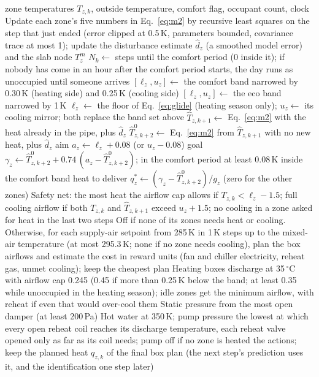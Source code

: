 \documentclass{article}
\begin{document}
\begin{algorithm}[H]
\caption{One five-minute control step of v16, for all zones $z$ at once (Sections~\ref{sec:model}--\ref{sec:schedule}).
Numbers are the settings of Table~\ref{tab:settings}, rounded; airflow caps are fractions of each box's maximum.}\label{alg:step}
\small\raggedright
\begin{algorithmic}[1]
\Require zone temperatures $T_{z,k}$, outside temperature, comfort flag, occupant count, clock
\State Update each zone's five numbers in Eq.~\ref{eq:m2} by recursive least squares on the step that just ended
(error clipped at 0.5\,K, parameters bounded, covariance trace at most 1); update the disturbance estimate $\hat d_z$
(a smoothed model error) and the slab node $T^m_z$
\State $N_k \gets$ steps until the comfort period (0 inside it); if nobody has come in an hour after the comfort
period starts, the day runs as unoccupied until someone arrives
\State $[\ell_z,u_z] \gets$ the comfort band narrowed by 0.30\,K (heating side) and 0.25\,K (cooling side)
\Else
\State $[\ell_z,u_z] \gets$ the eco band narrowed by 1\,K
\EndIf
{}
\State $\ell_z \gets$ the floor of Eq.~\ref{eq:glide} (heating season only); $u_z \gets$ its cooling mirror; both replace the band set above
\EndIf
\State $\hat T_{z,k+1} \gets$ Eq.~\ref{eq:m2} with the heat already in the pipe, plus $\hat d_z$
\State $\hat T^{0}_{z,k+2} \gets$ Eq.~\ref{eq:m2} from $\hat T_{z,k+1}$ with no new heat, plus $\hat d_z$
\State aim $a_z \gets \ell_z+0.08$ (or $u_z-0.08$)
\State goal $\gamma_z \gets \hat T^{0}_{z,k+2}+0.74\,(a_z-\hat T^{0}_{z,k+2})$; in the comfort period at least
0.08\,K inside the comfort band
\State heat to deliver $q^{*}_z \gets (\gamma_z-\hat T^{0}_{z,k+2})/g_z$ (zero for the other zones)
\EndFor
\State Safety net: the most heat the airflow cap allows if $T_{z,k}<\ell_z-1.5$; full cooling airflow if both
$T_{z,k}$ and $\hat T_{z,k+1}$ exceed $u_z+1.5$; no cooling in a zone asked for heat in the last two steps
\State Off if none of its zones needs heat or cooling. Otherwise, for each supply-air setpoint from 285\,K in 1\,K
steps up to the mixed-air temperature (at most 295.3\,K; none if no zone needs cooling), plan the box airflows and
estimate the cost in reward units (fan and chiller electricity, reheat gas, unmet cooling); keep the cheapest plan
\State Heating boxes discharge at 35\,$^\circ$C with airflow cap 0.245 (0.45 if more than 0.25\,K below the band; at
least 0.35 while unoccupied in the heating season); idle zones get the minimum airflow, with reheat if even
that would over-cool them
\State Static pressure from the most open damper (at least 200\,Pa)
\EndFor
\State Hot water at 350\,K; pump pressure the lowest at which every open reheat coil reaches its discharge
temperature, each reheat valve opened only as far as its coil needs; pump off if no zone is heated
\State \Return the actions; keep the planned heat $q_{z,k}$ of the final box plan (the next step's prediction uses it, and the identification one step later)
\end{algorithmic}
\end{algorithm}
\end{document}

